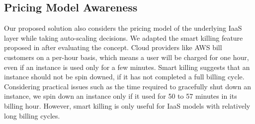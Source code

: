 \subsection {Pricing Model Awareness}
Our proposed solution also considers the pricing model of the underlying IaaS layer while taking auto-scaling decisions. We adapted the smart killing feature proposed in \cite{Bunch_2012} after evaluating the concept. Cloud providers like AWS bill customers on a per-hour basis, which means a user will be charged for one hour, even if an instance is used only for a few minutes. Smart killing suggests that an instance should not be spin downed, if it has not completed a full billing cycle. Considering practical issues such as the time required to gracefully shut down an instance, we spin down an instance only if it used for 50 to 57 minutes in its billing hour. However, smart killing is only useful for IaaS models with relatively long billing cycles.